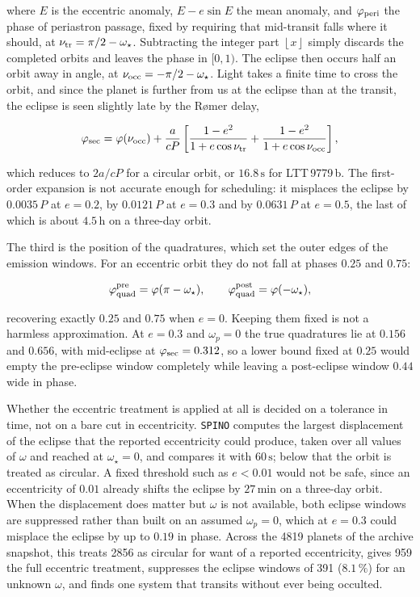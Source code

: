 where $E$ is the eccentric anomaly, $E - e\sin E$ the mean anomaly, and $\varphi_{\rm peri}$ the phase of periastron passage, fixed by requiring that mid-transit falls where it should, at $\nu_{\rm tr} = \pi/2 - \omega_\star$. Subtracting the integer part $\left\lfloor x \right\rfloor$ simply discards the completed orbits and leaves the phase in $[0,1)$. The eclipse then occurs half an orbit away in angle, at $\nu_{\rm occ} = -\pi/2 - \omega_\star$. Light takes a finite time to cross the orbit, and since the planet is further from us at the eclipse than at the transit, the eclipse is seen slightly late by the R\o mer delay,

\begin{equation}\label{eq:phisec}
\varphi_{\rm sec} = \varphi(\nu_{\rm occ}) + \frac{a}{cP}\left[ \frac{1-e^2}{1 + e\cos\nu_{\rm tr}} + \frac{1-e^2}{1 + e\cos\nu_{\rm occ}} \right] ,
\end{equation}

which reduces to $2a/cP$ for a circular orbit, or $16.8\,\mathrm{s}$ for LTT\,9779\,b. The first-order expansion is not accurate enough for scheduling: it misplaces the eclipse by $0.0035\,P$ at $e = 0.2$, by $0.0121\,P$ at $e = 0.3$ and by $0.0631\,P$ at $e = 0.5$, the last of which is about $4.5\,\mathrm{h}$ on a three-day orbit.

The third is the position of the quadratures, which set the outer edges of the emission windows. For an eccentric orbit they do not fall at phases $0.25$ and $0.75$:

\begin{equation}\label{eq:quad}
\varphi_{\rm quad}^{\rm pre} = \varphi(\pi - \omega_\star), \qquad
\varphi_{\rm quad}^{\rm post} = \varphi(-\omega_\star),
\end{equation}

recovering exactly $0.25$ and $0.75$ when $e = 0$. Keeping them fixed is not a harmless approximation. At $e = 0.3$ and $\omega_p = 0$ the true quadratures lie at $0.156$ and $0.656$, with mid-eclipse at $\varphi_{\rm sec} = 0.312$, so a lower bound fixed at $0.25$ would empty the pre-eclipse window completely while leaving a post-eclipse window $0.44$ wide in phase.

Whether the eccentric treatment is applied at all is decided on a tolerance in time, not on a bare cut in eccentricity. \texttt{SPINO} computes the largest displacement of the eclipse that the reported eccentricity could produce, taken over all values of $\omega$ and reached at $\omega_\star = 0$, and compares it with $60\,\mathrm{s}$; below that the orbit is treated as circular. A fixed threshold such as $e < 0.01$ would not be safe, since an eccentricity of $0.01$ already shifts the eclipse by $27\,\mathrm{min}$ on a three-day orbit. When the displacement does matter but $\omega$ is not available, both eclipse windows are suppressed rather than built on an assumed $\omega_p = 0$, which at $e = 0.3$ could misplace the eclipse by up to $0.19$ in phase. Across the 4819 planets of the archive snapshot, this treats 2856 as circular for want of a reported eccentricity, gives 959 the full eccentric treatment, suppresses the eclipse windows of 391 ($8.1\,\%$) for an unknown $\omega$, and finds one system that transits without ever being occulted.

